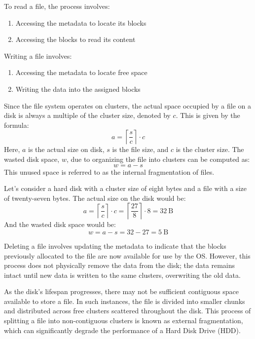 To read a file, the process involves:
\begin{enumerate}
    \item Accessing the metadata to locate its blocks
    \item Accessing the blocks to read its content
\end{enumerate}

Writing a file involves:
\begin{enumerate}
    \item Accessing the metadata to locate free space
    \item Writing the data into the assigned blocks
\end{enumerate}
Since the file system operates on clusters, the actual space occupied by a file on a disk is always a multiple of the cluster size, denoted by $c$. 
This is given by the formula:
\[a=\left\lceil \dfrac{s}{c} \right\rceil\cdot c\]
Here, $a$ is the actual size on disk, $s$ is the file size, and $c$ is the cluster size.
The wasted disk space, $w$, due to organizing the file into clusters can be computed as:
\[w=a-s\]
This unused space is referred to as the internal fragmentation of files.
\begin{example}
    Let's consider a hard disk with a cluster size of eight bytes and a file with a size of twenty-seven bytes. 
    The actual size on the disk would be:
    \[a=\left\lceil \dfrac{s}{c} \right\rceil\cdot c=\left\lceil \dfrac{27}{8} \right\rceil\cdot 8=32\:\text{B}\]
    And the wasted disk space would be:
    \[w=a-s=32-27=5\:\text{B}\]
\end{example}

Deleting a file involves updating the metadata to indicate that the blocks previously allocated to the file are now available for use by the OS. 
However, this process does not physically remove the data from the disk; the data remains intact until new data is written to the same clusters, overwriting the old data.

As the disk's lifespan progresses, there may not be sufficient contiguous space available to store a file. 
In such instances, the file is divided into smaller chunks and distributed across free clusters scattered throughout the disk.
This process of splitting a file into non-contiguous clusters is known as external fragmentation, which can significantly degrade the performance of a Hard Disk Drive (HDD).

